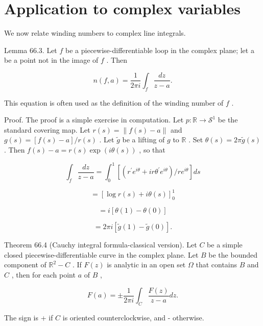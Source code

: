 \documentclass[10pt]{article}
\begin{document}
\section*{Application to complex variables}

We now relate winding numbers to complex line integrals.

Lemma 66.3. Let \(f\) be a piecewise-differentiable loop in the complex plane; let a be a point not in the image of \(f\) . Then

\[
n\left( {f,a}\right)  = \frac{1}{2\pi i}{\int }_{f}\frac{dz}{z - a}.
\]

This equation is often used as the definition of the winding number of \(f\) .

Proof. The proof is a simple exercise in computation. Let \(p : \mathbb{R} \rightarrow  {\mathcal{S}}^{1}\) be the standard covering map. Let \(r\left( s\right)  = \parallel f\left( s\right)  - a\parallel\) and \(g\left( s\right)  = \left\lbrack  {f\left( s\right)  - a}\right\rbrack  /r\left( s\right)\) . Let \(\widetilde{g}\) be a lifting of \(g\) to \(\mathbb{R}\) . Set \(\theta \left( s\right)  = {2\pi }\widetilde{g}\left( s\right)\) . Then \(f\left( s\right)  - a = r\left( s\right) \exp \left( {{i\theta }\left( s\right) }\right)\) , so that

\[
{\int }_{f}\frac{dz}{z - a} = {\int }_{0}^{1}\left\lbrack  {\left( {{r}^{\prime }{e}^{i\theta } + {ir}{\theta }^{\prime }{e}^{i\theta }}\right) /r{e}^{i\theta }}\right\rbrack  {ds}
\]

\[
= {\left\lbrack  \log r\left( s\right)  + i\theta \left( s\right) \right\rbrack  }_{0}^{1}
\]

\[
= i\left\lbrack  {\theta \left( 1\right)  - \theta \left( 0\right) }\right\rbrack
\]

\[
= {2\pi i}\left\lbrack  {\widetilde{g}\left( 1\right)  - \widetilde{g}\left( 0\right) }\right\rbrack  .
\]

Theorem 66.4 (Cauchy integral formula-classical version). Let \(C\) be a simple closed piecewise-differentiable curve in the complex plane. Let \(B\) be the bounded component of \({\mathbb{R}}^{2} - C\) . If \(F\left( z\right)\) is analytic in an open set \(\Omega\) that contains \(B\) and \(C\) , then for each point \(a\) of \(B\) ,

\[
F\left( a\right)  =  \pm  \frac{1}{2\pi i}{\int }_{C}\frac{F\left( z\right) }{z - a}{dz}.
\]

The sign is + if \(C\) is oriented counterclockwise, and - otherwise.
\end{document}
